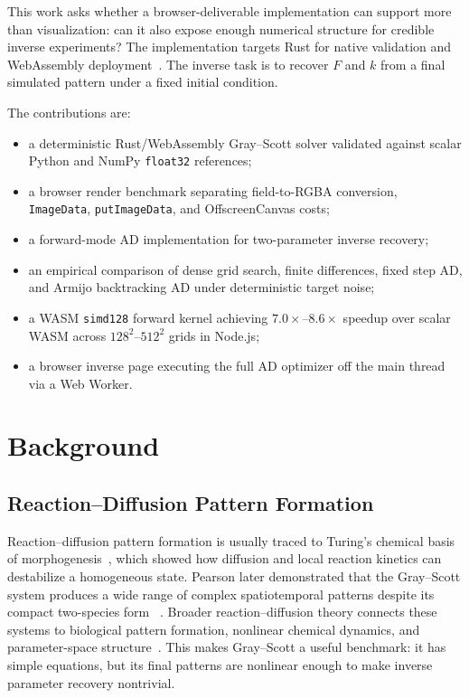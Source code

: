 \documentclass[journal]{IEEEtran}
\begin{document}
This work asks whether a browser-deliverable implementation can support more
than visualization: can it also expose enough numerical structure for credible
inverse experiments? The implementation targets Rust for native validation and
WebAssembly deployment~\cite{webassemblycore2}. The inverse task is to recover
\(F\) and \(k\) from a final simulated pattern under a fixed initial condition.

The contributions are:
\begin{itemize}
  \item a deterministic Rust/WebAssembly Gray--Scott solver validated against
  scalar Python and NumPy \texttt{float32} references;
  \item a browser render benchmark separating field-to-RGBA conversion,
  \texttt{ImageData}, \texttt{putImageData}, and OffscreenCanvas costs;
  \item a forward-mode AD implementation for two-parameter inverse recovery;
  \item an empirical comparison of dense grid search, finite differences, fixed
  step AD, and Armijo backtracking AD under deterministic target noise;
  \item a WASM \texttt{simd128} forward kernel achieving
  \(7.0\times\)--\(8.6\times\) speedup over scalar WASM across
  \(128^2\)--\(512^2\) grids in Node.js;
  \item a browser inverse page executing the full AD optimizer off the main
  thread via a Web Worker.
\end{itemize}

\section{Background}
\subsection{Reaction--Diffusion Pattern Formation}
Reaction--diffusion pattern formation is usually traced to Turing's chemical
basis of morphogenesis~\cite{turing1952morphogenesis}, which showed how
diffusion and local reaction kinetics can destabilize a homogeneous state.
Pearson later demonstrated that the Gray--Scott system produces a wide range of
complex spatiotemporal patterns despite its compact two-species form
~\cite{pearson1993complex}. Broader reaction--diffusion theory connects these
systems to biological pattern formation, nonlinear chemical dynamics, and
parameter-space structure~\cite{murray1982parameter,murray2003mathematical,
koch1994biological,epstein1998nonlinear}. This makes Gray--Scott a useful
benchmark: it has simple equations, but its final patterns are nonlinear enough
to make inverse parameter recovery nontrivial.
\end{document}
